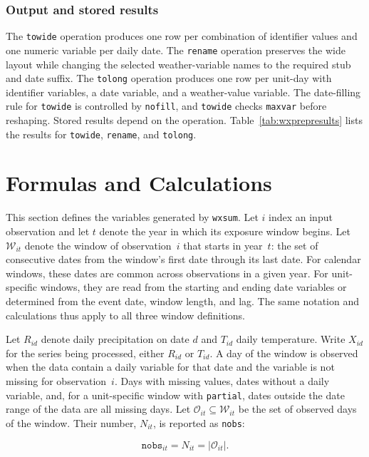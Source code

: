 \subsubsection{Output and stored results}

The \texttt{towide} operation produces one row per combination of identifier values and one numeric variable per daily date. The \texttt{rename} operation preserves the wide layout while changing the selected weather-variable names to the required stub and date suffix. The \texttt{tolong} operation produces one row per unit-day with identifier variables, a date variable, and a weather-value variable. The date-filling rule for \texttt{towide} is controlled by \texttt{nofill}, and \texttt{towide} checks \texttt{maxvar} before reshaping. Stored results depend on the operation. Table~\ref{tab:wxprepresults} lists the results for \texttt{towide}, \texttt{rename}, and \texttt{tolong}.

\section{Formulas and Calculations}

This section defines the variables generated by \texttt{wxsum}. Let $i$ index an input observation and let $t$ denote the year in which its exposure window begins.  Let $\mathcal{W}_{it}$ denote the window of observation~$i$ that starts in year~$t$: the set of consecutive dates from the window's first date through its last date. For calendar windows, these dates are common across observations in a given year. For unit-specific windows, they are read from the starting and ending date variables or determined from the event date, window length, and lag. The same notation and calculations thus apply to all three window definitions.

Let $R_{id}$ denote daily precipitation on date $d$ and $T_{id}$ daily temperature. Write $X_{id}$ for the series being processed, either $R_{id}$ or $T_{id}$. A day of the window is observed when the data contain a daily variable for that date and the variable is not missing for observation~$i$. Days with missing values, dates without a daily variable, and, for a unit-specific window with \texttt{partial}, dates outside the date range of the data are all missing days. Let $\mathcal{O}_{it} \subseteq \mathcal{W}_{it}$ be the set of observed days of the window. Their number, $N_{it}$, is reported as \texttt{nobs}:

\begin{equation}
	\texttt{nobs}_{it} = N_{it} = \left| \mathcal{O}_{it} \right| .
\end{equation}

